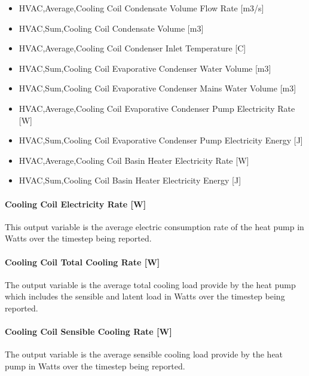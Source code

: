 \begin{itemize}
\item
  HVAC,Average,Cooling Coil Condensate Volume Flow Rate {[}m3/s{]}
\item
  HVAC,Sum,Cooling Coil Condensate Volume {[}m3{]}
\item
  HVAC,Average,Cooling Coil Condenser Inlet Temperature {[}C{]}
\item
  HVAC,Sum,Cooling Coil Evaporative Condenser Water Volume {[}m3{]}
\item
  HVAC,Sum,Cooling Coil Evaporative Condenser Mains Water Volume {[}m3{]}
\item
  HVAC,Average,Cooling Coil Evaporative Condenser Pump Electricity Rate {[}W{]}
\item
  HVAC,Sum,Cooling Coil Evaporative Condenser Pump Electricity Energy {[}J{]}
\item
  HVAC,Average,Cooling Coil Basin Heater Electricity Rate {[}W{]}
\item
  HVAC,Sum,Cooling Coil Basin Heater Electricity Energy {[}J{]}
\end{itemize}

\paragraph{Cooling Coil Electricity Rate {[}W{]}}\label{cooling-coil-electric-power-w-1}

This output variable is the average electric consumption rate of the heat pump in Watts over the timestep being reported.

\paragraph{Cooling Coil Total Cooling Rate {[}W{]}}\label{cooling-coil-total-cooling-rate-w-5}

The output variable is the average total cooling load provide by the heat pump which includes the sensible and latent load in Watts over the timestep being reported.

\paragraph{Cooling Coil Sensible Cooling Rate {[}W{]}}\label{cooling-coil-sensible-cooling-rate-w-5}

The output variable is the average sensible cooling load provide by the heat pump in Watts over the timestep being reported.

